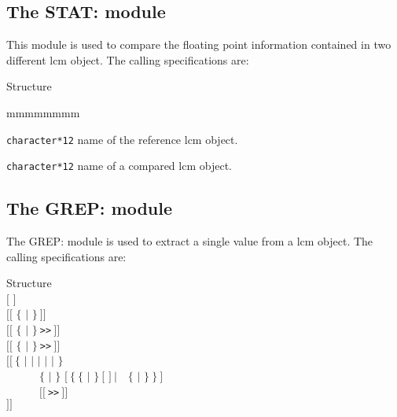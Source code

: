\clearpage

\subsection{The STAT: module}\label{sect:STATData}

This module is used to compare the floating point information contained in two
different {\sc lcm} object. The calling
specifications are:

\begin{DataStructure}{Structure }
   \moc{;}
\end{DataStructure}

\begin{ListeDeDescription}{mmmmmmmm}

\item[\dusa{NAME1}] {\tt character*12} name of the reference {\sc lcm} object.

\item[\dusa{NAME2}] {\tt character*12} name of a compared {\sc lcm} object.

\end{ListeDeDescription}

\clearpage

\subsection{The GREP: module}\label{sect:GREPData}

 The GREP: module is used to extract a single value from a {\sc lcm} object. The
calling specifications are:

\vskip -0.2cm

\begin{DataStructure}{Structure }
  \moc{::} \\
$[$   $]$ \\
$[[$  $\{$   $|$   $\}~]]$ \\
$[[$  $\{$  $|$  $\}~${\tt >>}$~]]$ \\
$[[$  $\{$  $|$  $\}~${\tt >>}$~]]$ \\
$[[~\{$  $|$  $|$   $|$  $|$   $|$  $\}$ \\
~~~~~~$\{$  $|$  $\}$  $[~\{~\{$  $|$ \moc{*} $\}~[$ 
    $]~|$~~$\{$  $|$ \moc{*} $\}~\}~]$ \\
~~~~~~$[[~${\tt >>}$~]]$ \\
$]]$ \moc{;}
\end{DataStructure}

